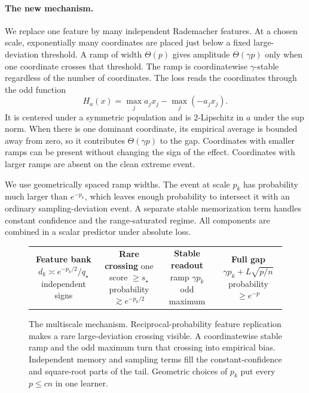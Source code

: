 \documentclass{article}
\newcommand{\1}{\mathbf 1}
\begin{document}
\paragraph{The new mechanism.}
We replace one feature by many independent Rademacher features. At a chosen scale, exponentially many coordinates are placed just below a fixed large-deviation threshold. A ramp of width $\Theta(p)$ gives amplitude $\Theta(\gamma p)$ only when one coordinate crosses that threshold. The ramp is coordinatewise $\gamma$-stable regardless of the number of coordinates. The loss reads the coordinates through the odd function
\begin{equation}
 H_a(x)=\max_j a_jx_j-\max_j(-a_jx_j).
 \label{eq:H-intro}
\end{equation}
It is centered under a symmetric population and is $2$-Lipschitz in $a$ under the sup norm. When there is one dominant coordinate, its empirical average is bounded away from zero, so it contributes $\Theta(\gamma p)$ to the gap. Coordinates with smaller ramps can be present without changing the sign of the effect. Coordinates with larger ramps are absent on the clean extreme event.

We use geometrically spaced ramp widths. The event at scale $p_k$ has probability much larger than $e^{-p_k}$, which leaves enough probability to intersect it with an ordinary sampling-deviation event. A separate stable memorization term handles constant confidence and the range-saturated regime. All components are combined in a scalar predictor under absolute loss.

\begin{figure}[t]
\centering
\small \setlength{\tabcolsep}{3pt}
\begin{tabular}{c@{\ $\Longrightarrow$\ }c@{\ $\Longrightarrow$\ }c@{\ $\Longrightarrow$\ }c}
\fbox{\parbox[c][0.66in][c]{0.18\linewidth}{\centering
\textbf{Feature bank}\\[-2pt]
$d_k\asymp e^{-p_k/2}/q_\star$\\
independent signs}}
&
\fbox{\parbox[c][0.66in][c]{0.18\linewidth}{\centering
\textbf{Rare crossing}\\[-2pt]
one score $\ge s_\star$\\
probability $\gtrsim e^{-p_k/2}$}}
&
\fbox{\parbox[c][0.66in][c]{0.18\linewidth}{\centering
\textbf{Stable readout}\\[-2pt]
ramp $\gamma p_k$\\
odd maximum}}
&
\fbox{\parbox[c][0.66in][c]{0.18\linewidth}{\centering
\textbf{Full gap}\\[-2pt]
$\gamma p_k+L\sqrt{p/n}$\\
probability $\ge e^{-p}$}}
\end{tabular}
\caption{The multiscale mechanism. Reciprocal-probability feature replication makes a rare
large-deviation crossing visible. A coordinatewise stable ramp and the odd maximum turn that crossing into empirical bias. Independent memory and sampling terms fill the constant-confidence and square-root parts of the tail. Geometric choices of $p_k$ put every $p\le c n$ in one learner.}
\label{fig:mechanism}
\end{figure}
\end{document}
